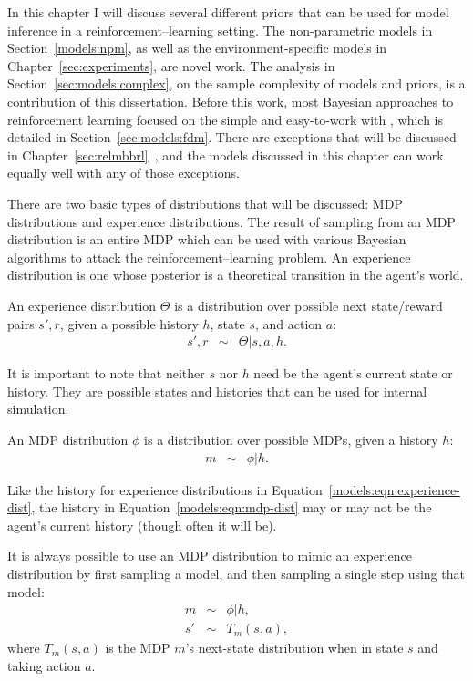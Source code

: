 In this chapter I will discuss several different priors that can be used for model inference in a reinforcement--learning setting. The non-parametric models in Section~\ref{models:npm}, as well as the environment-specific models in Chapter~\ref{sec:experiments}, are novel work. The analysis in Section~\ref{sec:models:complex}, on the sample complexity of models and priors, is a contribution of this dissertation. Before this work, most Bayesian approaches to reinforcement learning focused on the simple and easy-to-work with , which is detailed in Section~\ref{sec:models:fdm}. There are exceptions that will be discussed in Chapter~\ref{sec:relmbbrl}~\cite{strens00,sorg10,wilson07}, and the models discussed in this chapter can work equally well with any of those exceptions.

There are two basic types of distributions that will be discussed: MDP distributions and experience distributions. The result of sampling from an MDP distribution is an entire MDP which can be used with various Bayesian algorithms to attack the reinforcement--learning problem. An experience distribution is one whose posterior is a theoretical transition in the agent's world.

An experience distribution $\Theta$ is a distribution over possible next state/reward pairs $s',r$, given a possible history $h$, state $s$, and action $a$:
\begin{eqnarray}
\label{models:eqn:experience-dist} s', r &\sim& \Theta | s, a, h.
\end{eqnarray}

It is important to note that neither $s$ nor $h$ need be the agent's current state or history. They are possible states and histories that can be used for internal simulation.

An MDP distribution $\phi$ is a distribution over possible MDPs, given a history $h$:
\begin{eqnarray}
\label{models:eqn:mdp-dist} m &\sim& \phi|h.
\end{eqnarray}

Like the history for experience distributions in Equation~\ref{models:eqn:experience-dist}, the history in Equation~\ref{models:eqn:mdp-dist} may or may not be the agent's current history (though often it will be).

It is always possible to use an MDP distribution to mimic an experience distribution by first sampling a model, and then sampling a single step using that model:
\begin{eqnarray}
m &\sim& \phi|h,\\
s' &\sim& T_m(s,a),
\end{eqnarray}
where $T_m(s,a)$ is the MDP $m$'s next-state distribution when in state $s$ and taking action $a$.


